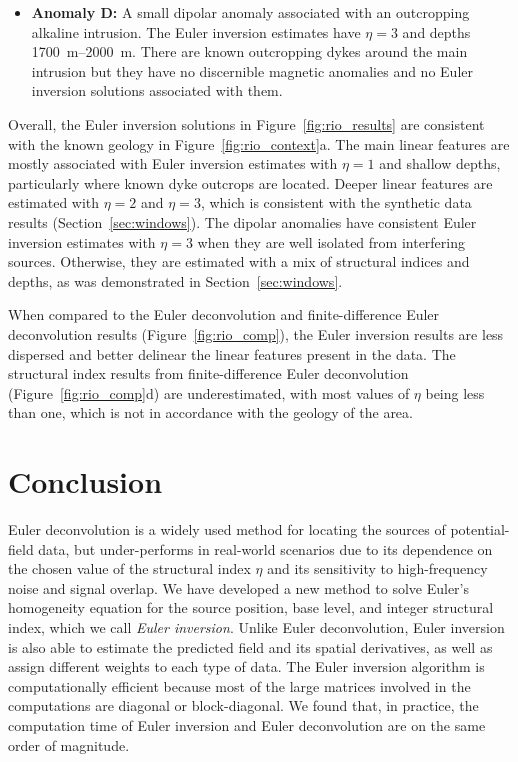 \begin{itemize}
\item \textbf{Anomaly D:} A small dipolar anomaly associated with an
    outcropping alkaline intrusion. The Euler inversion estimates have $\eta=3$
    and depths \qtyrange{1700}{2000}{\m}. There are known outcropping dykes
    around the main intrusion but they have no discernible magnetic anomalies
    and no Euler inversion solutions associated with them.
\end{itemize}

Overall, the Euler inversion solutions in Figure~\ref{fig:rio_results} are
consistent with the known geology in Figure~\ref{fig:rio_context}a.
The main linear features are mostly associated with Euler inversion estimates
with $\eta=1$ and shallow depths, particularly where known dyke outcrops are
located.
Deeper linear features are estimated with $\eta=2$ and $\eta=3$, which is
consistent with the synthetic data results (Section~\ref{sec:windows}).
The dipolar anomalies have consistent Euler inversion estimates with $\eta=3$
when they are well isolated from interfering sources.
Otherwise, they are estimated with a mix of structural indices and depths, as
was demonstrated in Section~\ref{sec:windows}.

When compared to the Euler deconvolution and finite-difference Euler
deconvolution results (Figure~\ref{fig:rio_comp}), the Euler inversion results
are less dispersed and better delinear the linear features present in the data.
The structural index results from finite-difference Euler deconvolution
(Figure~\ref{fig:rio_comp}d) are underestimated, with most values of $\eta$
being less than one, which is not in accordance with the geology of the area.

\section{Conclusion}

Euler deconvolution is a widely used method for locating the sources of
potential-field data, but under-performs in real-world scenarios due to its
dependence on the chosen value of the structural index $\eta$ and its
sensitivity to high-frequency noise and signal overlap.
We have developed a new method to solve Euler's homogeneity equation for the
source position, base level, and integer structural index, which we call
\textit{Euler inversion}.
Unlike Euler deconvolution, Euler inversion is also able to estimate the
predicted field and its spatial derivatives, as well as assign different
weights to each type of data.
The Euler inversion algorithm is computationally efficient because most of the
large matrices involved in the computations are diagonal or block-diagonal.
We found that, in practice, the computation time of Euler inversion and Euler
deconvolution are on the same order of magnitude.

